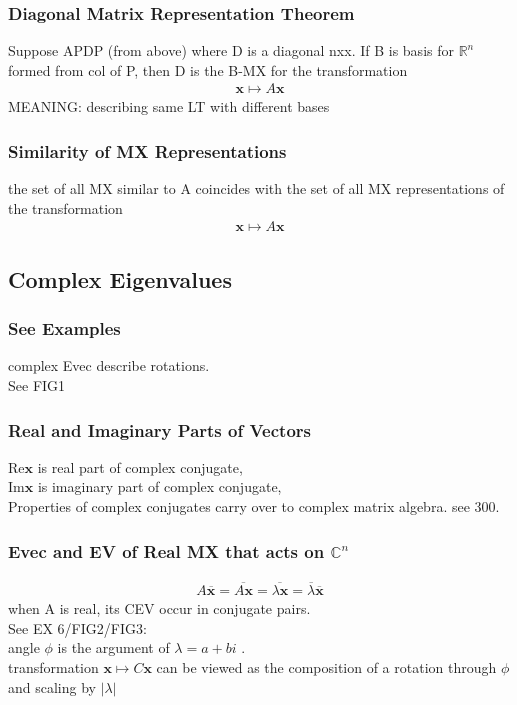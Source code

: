 \documentclass[12pt]{article}
\newcommand{\R}{\mathbb{R}}
\newcommand{\C}{\mathbb{C}}
\begin{document}
    \subsubsection{Diagonal Matrix Representation Theorem}
        Suppose APDP (from above) where D is a diagonal nxx. If B
        is basis for $\R^n$  formed from col of P, then D is
        the B-MX for the transformation
        \begin{align*}
            \bm{x} \mapsto A\bm{x}
        \end{align*}
        MEANING: describing same LT with different bases
    \subsubsection{Similarity of MX Representations}
        the set of all MX similar to A coincides with the
        set of all MX representations of the transformation
        \begin{align*}
            \bm{x} \mapsto A\bm{x}
        \end{align*}
\subsection{Complex Eigenvalues}
    \subsubsection{See Examples}
        complex Evec describe rotations.\\
        See FIG1
    \subsubsection{Real and Imaginary Parts of Vectors}
        $\text{Re}\bm{x}$  is real part of complex conjugate,\\
        $ \text{Im}\bm{x} $ is imaginary part of complex conjugate,\\
        Properties of complex conjugates carry over to complex
        matrix algebra. see 300.
    \subsubsection{Evec and EV of Real MX that acts on $\C^n$ }
        \begin{align*}
            A\bm{\overline{x}} = \overline{A\bm{x}} = 
            \overline{\lambda \bm{x}} = \overline{\lambda }\overline{\bm{x}}
        \end{align*}
        when A is real, its CEV occur in conjugate pairs.\\
        See EX 6/FIG2/FIG3:\\
        angle $\phi $  is the argument of $\lambda= a + bi$  .\\
        transformation  $\bm{x}\mapsto C\bm{x}$  can be viewed as the
        composition of a rotation through $\phi $  and scaling by 
        $|\lambda |$ 
\end{document}
